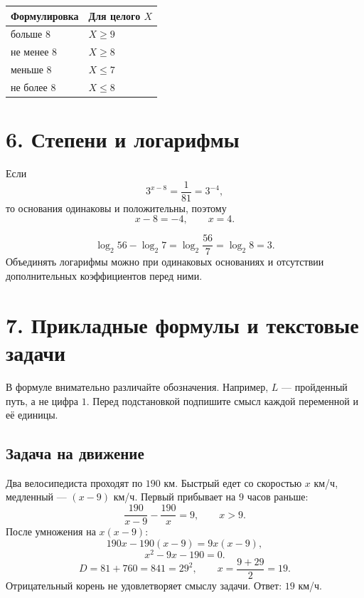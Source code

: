 \documentclass[a4paper,12pt]{article}
\begin{document}
\begin{keybox}
\begin{tabularx}{\linewidth}{@{}lX@{}}
\toprule
Формулировка & Для целого $X$ \\
\midrule
больше $8$ & $X\ge 9$ \\
не менее $8$ & $X\ge 8$ \\
меньше $8$ & $X\le 7$ \\
не более $8$ & $X\le 8$ \\
\bottomrule
\end{tabularx}
\end{keybox}

\section*{6. Степени и логарифмы}
\begin{examplebox}
Если
\[
3^{x-8}=\frac1{81}=3^{-4},
\]
то основания одинаковы и положительны, поэтому
\[
x-8=-4,\qquad x=4.
\]
\end{examplebox}

\begin{examplebox}
\[
\log_2 56-\log_2 7
=\log_2\frac{56}{7}
=\log_2 8=3.
\]
Объединять логарифмы можно при одинаковых основаниях и отсутствии дополнительных коэффициентов перед ними.
\end{examplebox}

\section*{7. Прикладные формулы и текстовые задачи}
\begin{warnbox}
В формуле внимательно различайте обозначения. Например, $L$ --- пройденный путь, а не цифра $1$. Перед подстановкой подпишите смысл каждой переменной и её единицы.
\end{warnbox}

\subsection*{Задача на движение}
Два велосипедиста проходят по $190$ км. Быстрый едет со скоростью $x$ км/ч, медленный --- $(x-9)$ км/ч. Первый прибывает на $9$ часов раньше:
\[
\frac{190}{x-9}-\frac{190}{x}=9,\qquad x>9.
\]
После умножения на $x(x-9)$:
\[
190x-190(x-9)=9x(x-9),
\]
\[
x^2-9x-190=0.
\]
\[
D=81+760=841=29^2,\qquad x=\frac{9+29}{2}=19.
\]
Отрицательный корень не удовлетворяет смыслу задачи. Ответ: $19$ км/ч.
\end{document}
